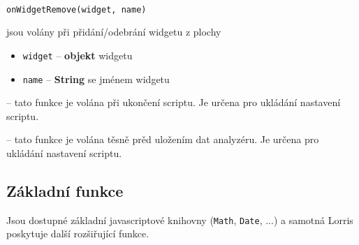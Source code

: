 \documentclass[12pt, a4paper, oneside]{article}
\begin{document}
 \\
{\color{blue}\verb/onWidgetRemove(widget, name)/}

jsou volány při přidání/odebrání widgetu z plochy
\begin{itemize}
    \item \verb/widget/ -- {\bf objekt} widgetu
    \item \verb/name/ -- {\bf String} se jménem widgetu
\end{itemize}

 -- tato funkce je volána při ukončení scriptu. Je určena pro ukládání nastavení scriptu.

 -- tato funkce je volána těsně prěd uložením dat analyzéru. Je určena pro ukládání nastavení scriptu.

\subsection*{Základní funkce}
Jsou dostupné základní javascriptové knihovny (\verb/Math/, \verb/Date/, ...) a samotná Lorris poskytuje další rozšiřující funkce. 
\end{document}
